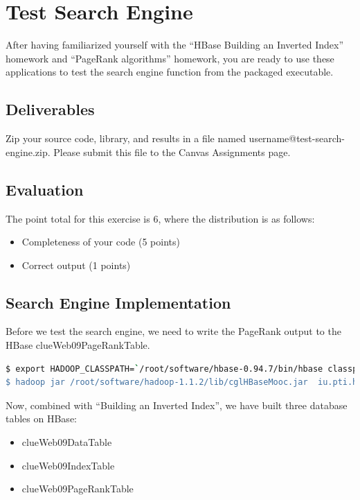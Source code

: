 \section*{Test Search Engine}

After having familiarized yourself with the ``HBase Building an Inverted
Index'' homework and ``PageRank algorithms'' homework, you are ready to use
these applications to test the search engine function from the packaged
executable.

\subsection*{Deliverables}
Zip your source code, library, and results in a file named
username@test-search-engine.zip. Please submit this file to the Canvas
Assignments page.

\subsection*{Evaluation}
The point total for this exercise is 6, where the distribution is as follows:
\begin{itemize}
\item Completeness of your code (5 points)
\item Correct output (1 points)
\end{itemize}

\subsection*{Search Engine Implementation}
Before we test the search engine, we need to write the PageRank output to the
HBase clueWeb09PageRankTable.

\begin{lstlisting}[language=bash]
$ export HADOOP_CLASSPATH=`/root/software/hbase-0.94.7/bin/hbase classpath'
$ hadoop jar /root/software/hadoop-1.1.2/lib/cglHBaseMooc.jar  iu.pti.hbaseapp.clueweb09.PageRankTableLoader  /root/MoocHomeworks/HBaseInvertedIndexing/resources/en0000-01and02.docToNodeIdx.txt  /root/MoocHomeworks/HBaseInvertedIndexing/resources/en0000-01and02_reset_idx_and_square_pagerank.out
\end{lstlisting}

Now, combined with ``Building an Inverted Index'', we have built three database
tables on HBase:

\begin{itemize}
\item clueWeb09DataTable
\item clueWeb09IndexTable
\item clueWeb09PageRankTable
\end{itemize}

